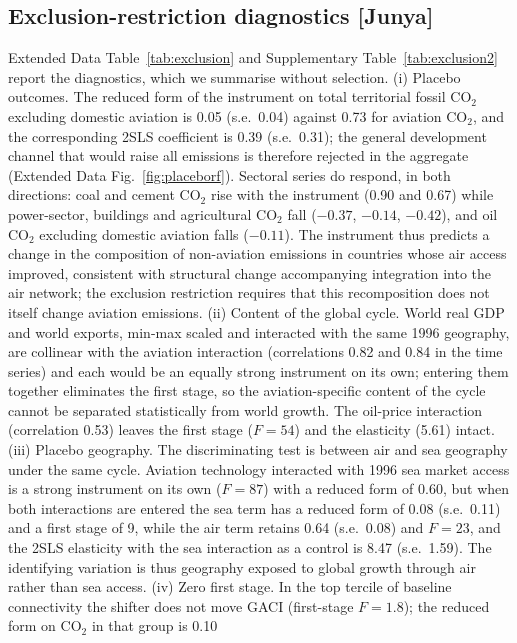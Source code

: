 \documentclass[12pt]{article}
\begin{document}
\subsection*{Exclusion-restriction diagnostics [Junya]}
Extended Data Table~\ref{tab:exclusion} and Supplementary
Table~\ref{tab:exclusion2} report the diagnostics, which we summarise
without selection. (i) Placebo outcomes. The reduced form of the
instrument on total territorial fossil CO$_2$ excluding domestic aviation
is 0.05 (s.e.\ 0.04) against 0.73 for aviation CO$_2$, and the
corresponding 2SLS coefficient is 0.39 (s.e.\ 0.31); the general
development channel that would raise all emissions is therefore rejected
in the aggregate (Extended Data Fig.~\ref{fig:placeborf}). Sectoral
series do respond, in both directions: coal and cement CO$_2$ rise with the
instrument (0.90 and 0.67) while power-sector, buildings and agricultural
CO$_2$ fall ($-0.37$, $-0.14$, $-0.42$), and oil CO$_2$ excluding domestic
aviation falls ($-0.11$). The instrument thus predicts a change in the
composition of non-aviation emissions in countries whose air access
improved, consistent with structural change accompanying integration into
the air network; the exclusion restriction requires that this
recomposition does not itself change aviation emissions. (ii) Content of
the global cycle. World real GDP and world exports, min-max scaled and
interacted with the same 1996 geography, are collinear with the aviation
interaction (correlations 0.82 and 0.84 in the time series) and each
would be an equally strong instrument on its own; entering them together
eliminates the first stage, so the aviation-specific content of the cycle
cannot be separated statistically from world growth. The oil-price
interaction (correlation 0.53) leaves the first stage ($F = 54$) and the
elasticity (5.61) intact. (iii) Placebo geography. The discriminating
test is between air and sea geography under the same cycle. Aviation
technology interacted with 1996 sea market access is a strong instrument
on its own ($F = 87$) with a reduced form of 0.60, but when both
interactions are entered the sea term has a reduced form of 0.08 (s.e.\
0.11) and a first stage of 9, while the air term retains 0.64 (s.e.\ 0.08)
and $F = 23$, and the 2SLS elasticity with the sea interaction as a control
is 8.47 (s.e.\ 1.59). The identifying variation is thus geography exposed
to global growth through air rather than sea access. (iv) Zero first stage.
In the top tercile of baseline connectivity the shifter does not move GACI
(first-stage $F = 1.8$); the reduced form on CO$_2$ in that group is 0.10
\end{document}
